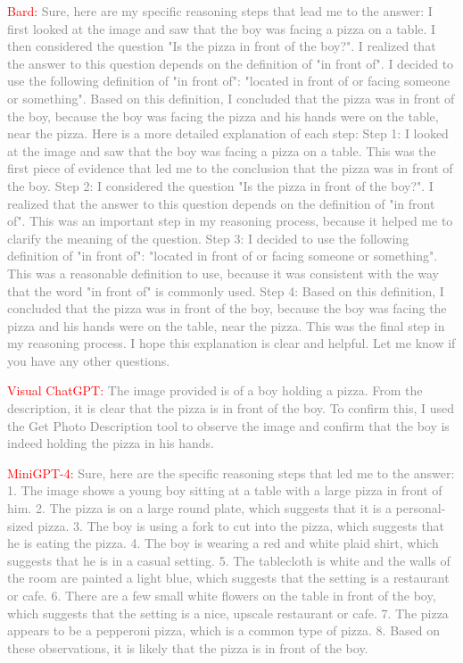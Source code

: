 \documentclass[twocolumn,11pt]{report}
\begin{document}
\textcolor{red}{Bard:} \textcolor{gray}{Sure, here are my specific reasoning steps that lead me to the answer: I first looked at the image and saw that the boy was facing a pizza on a table. I then considered the question "Is the pizza in front of the boy?". I realized that the answer to this question depends on the definition of "in front of".
I decided to use the following definition of "in front of": "located in front of or facing someone or something". Based on this definition, I concluded that the pizza was in front of the boy, because the boy was facing the pizza and his hands were on the table, near the pizza.
Here is a more detailed explanation of each step:
Step 1: I looked at the image and saw that the boy was facing a pizza on a table. This was the first piece of evidence that led me to the conclusion that the pizza was in front of the boy.
Step 2: I considered the question "Is the pizza in front of the boy?". I realized that the answer to this question depends on the definition of "in front of". This was an important step in my reasoning process, because it helped me to clarify the meaning of the question.
Step 3: I decided to use the following definition of "in front of": "located in front of or facing someone or something". This was a reasonable definition to use, because it was consistent with the way that the word "in front of" is commonly used.
Step 4: Based on this definition, I concluded that the pizza was in front of the boy, because the boy was facing the pizza and his hands were on the table, near the pizza. This was the final step in my reasoning process.
I hope this explanation is clear and helpful. Let me know if you have any other questions.}

\textcolor{red}{Visual ChatGPT:} \textcolor{gray}{The image provided is of a boy holding a pizza. From the description, it is clear that the pizza is in front of the boy. To confirm this, I used the Get Photo Description tool to observe the image and confirm that the boy is indeed holding the pizza in his hands.}

\textcolor{red}{MiniGPT-4:} \textcolor{gray}{Sure, here are the specific reasoning steps that led me to the answer:
1. The image shows a young boy sitting at a table with a large pizza in front of him.
2. The pizza is on a large round plate, which suggests that it is a personal-sized pizza.
3. The boy is using a fork to cut into the pizza, which suggests that he is eating the pizza.
4. The boy is wearing a red and white plaid shirt, which suggests that he is in a casual setting.
5. The tablecloth is white and the walls of the room are painted a light blue, which suggests that the setting is a restaurant or cafe.
6. There are a few small white flowers on the table in front of the boy, which suggests that the setting is a nice, upscale restaurant or cafe.
7. The pizza appears to be a pepperoni pizza, which is a common type of pizza.
8. Based on these observations, it is likely that the pizza is in front of the boy.}
\end{document}
